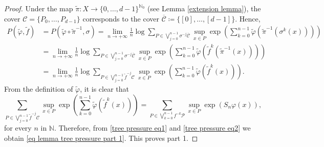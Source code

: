 \documentclass[10pt,a4paper]{amsart}
\numberwithin{equation}{section} %
\numberwithin{figure}{section} %
\newcommand{\N}{\mathbb{N}}
\renewcommand{\=}{\coloneqq}
\begin{document}
\begin{proof}
    Under the map $\widetilde{\pi}: X\to\{0,\dots,d-1\}^{\N_0}$ (see Lemma \ref{extension lemma}), the cover $\mathcal{C}=\{P_0,\ldots,P_{d-1}\}$ corresponds to the cover $\overline{\mathcal{C}}\=\{[0],\ldots, [d-1]\}$. 
Hence,
\begin{equation}\label{tree pressure eq2}
\begin{split}
    P(\widetilde{\varphi},\widetilde{f}) &= P(\widetilde{\varphi}\circ \widetilde{\pi}^{-1},\sigma ) = \lim_{n\to+\infty}\frac{1}{n}\log \sum_{P\in \bigvee_{j=0}^{n-1}\sigma^{-j}\overline{\mathcal{C}}} \sup_{x\in P}\exp\left(\sum_{k=0}^{n-1} \widetilde{\varphi}(\widetilde{\pi}^{-1}(\sigma^k(x)))\right) \\
    &=\lim_{n\to+\infty}\frac{1}{n}\log \sum_{P\in \bigvee_{j=0}^{n-1}\sigma^{-j}\overline{\mathcal{C}}} \sup_{x\in P}\exp\left(\sum_{k=0}^{n-1}\widetilde{\varphi}(\widetilde{f}^k(\widetilde{\pi}^{-1}(x)))\right)\\
    &= \lim_{n\to+\infty}\frac{1}{n}\log \sum_{P\in\bigvee_{j=0}^{n-1}\widetilde{f}^{-j}\mathcal{C}} \sup_{x\in P} \exp\left(\sum_{k=0}^{n-1} \widetilde{\varphi}(\widetilde{f}^k(x))\right).
    \end{split}
\end{equation}
From the definition of $\widetilde{\varphi}$, it is clear that 
\begin{equation*}
\sum_{P\in\bigvee_{j=0}^{n-1}\widetilde{f}^{-j}\mathcal{C}} \sup_{x\in P} \exp\left(\sum_{k=0}^{n-1} \widetilde{\varphi}(\widetilde{f}^k(x))\right) =  \sum_{P\in \bigvee_{k=0}^{n-1}f^{-k} \mathcal{P}} \sup_{x\in P}\exp(S_n\varphi(x)),
\end{equation*}
for every $n$ in $\N$. Therefore, from \eqref{tree pressure eq1} and \eqref{tree pressure eq2} we obtain \eqref{eq lemma tree pressure part 1}. This proves part 1.


\end{proof}
\end{document}
